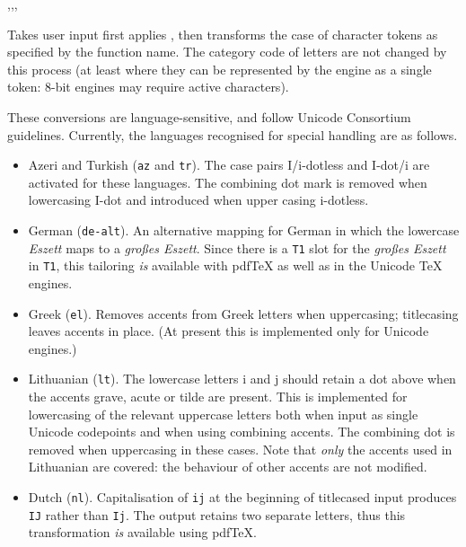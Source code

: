 \documentclass[oneside]{book}
\begin{document}
\begin{function}{\TextLangLowercase,\TextLangUppercase,\TextLangTitlecase,\TextLangTitlecaseFirst}
\begin{syntax}
  
  
  
  
\end{syntax}
Takes user input  first applies , then
transforms the case of character tokens as specified by the
function name. The category code of letters are not changed by this
process (at least where they can be represented by the engine as a single
token: $8$-bit engines may require active characters).
\par
These conversions are language-sensitive, and follow Unicode Consortium guidelines.
Currently, the languages recognised for special handling are as follows.
\begin{itemize}
\item Azeri and Turkish (\texttt{az} and \texttt{tr}).
  The case pairs I/i-dotless and I-dot/i are activated for these
  languages. The combining dot mark is removed when lowercasing
  I-dot and introduced when upper casing i-dotless.
\item German (\texttt{de-alt}).
  An alternative mapping for German in which the lowercase
  \emph{Eszett} maps to a \emph{gro\ss{}es Eszett}. Since there is
  a \verb|T1| slot for the \emph{gro\ss{}es Eszett} in \verb|T1|, this
  tailoring \emph{is} available with pdfTeX as well as in the
  Unicode \TeX{} engines.
\item Greek (\texttt{el}).
  Removes accents from Greek letters when uppercasing; titlecasing
  leaves accents in place. (At present this is implemented only
  for Unicode engines.)
\item Lithuanian (\texttt{lt}).
  The lowercase letters i and j should retain a dot above when the
  accents grave, acute or tilde are present. This is implemented for
  lowercasing of the relevant uppercase letters both when input as
  single Unicode codepoints and when using combining accents. The
  combining dot is removed when uppercasing in these cases. Note that
  \emph{only} the accents used in Lithuanian are covered: the behaviour
  of other accents are not modified.
\item Dutch (\texttt{nl}).
  Capitalisation of \texttt{ij} at the beginning of titlecased
  input produces \texttt{IJ} rather than \texttt{Ij}. The output
  retains two separate letters, thus this transformation \emph{is}
  available using pdfTeX.
\end{itemize}
\end{function}
\end{document}
